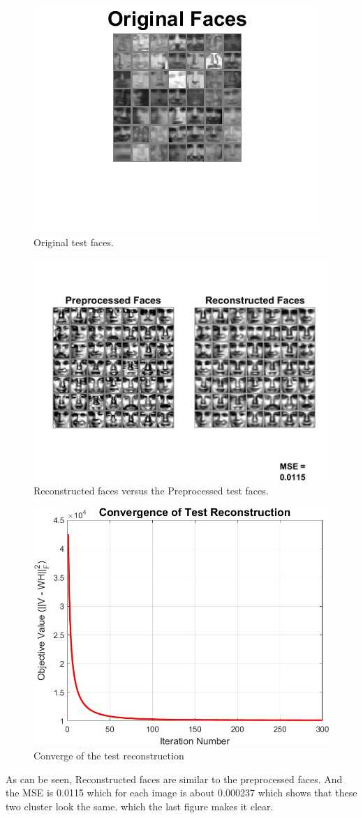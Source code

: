 \documentclass[journal,12pt,onecolumn,draftclsnofoot]{IEEEtran}
\begin{document}
\begin{figure}[ht]
    \centering
    \includegraphics[width=0.8\linewidth]{images/OriginalFaces_partD.jpeg}
    \caption{Original test faces.}
    \label{fig:OriginalFaces}
\end{figure}
\begin{figure}[ht]
    \centering
    \includegraphics[width=0.8\linewidth]{images/Preprocessed_Reconstructed.jpeg}
    \caption{Reconstructed faces versus the Preprocessed test faces.}
    \label{fig:reconstruction}
\end{figure}

\begin{figure}[ht]
    \centering
    \includegraphics[width=0.8\linewidth]{images/untitled2.jpg}
    \caption{Converge of the test reconstruction}
    \label{fig:reconstruction}
\end{figure}


As can be seen, Reconstructed faces are similar to the preprocessed faces. And the MSE is 0.0115 which for each image is about 0.000237 which shows that these two cluster look the same. which the last figure makes it clear.
\end{document}
